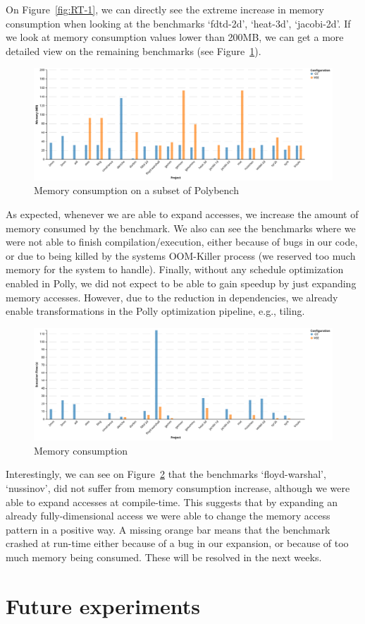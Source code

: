 On Figure~\ref{fig:RT-1}, we can directly see the extreme increase in memory consumption when looking at the benchmarks ‘fdtd-2d’, ‘heat-3d’, ‘jacobi-2d’. If we look at memory consumption values lower than 200MB, we can get a more detailed view on the remaining benchmarks (see Figure~\ref{fig:RT-2}).

\begin{figure}
\centering
\includegraphics[angle=90,origin=c,scale=0.5]{gfx/Evaluation/RT-2.png}
\caption{Memory consumption on a subset of Polybench}
\label{fig:RT-2}
\end{figure}

As expected, whenever we are able to expand accesses, we increase the amount of memory consumed by the benchmark. We also can see the benchmarks where we were not able to finish compilation/execution, either because of bugs in our code, or due to being killed by the systems OOM-Killer process (we reserved too much memory for the system to handle). Finally, without any schedule optimization enabled in Polly, we did not expect to be able to gain speedup by just expanding memory accesses. However, due to the reduction in dependencies, we already enable transformations in the Polly optimization pipeline, e.g., tiling.

\begin{figure}
\centering
\includegraphics[angle=90,origin=c,scale=0.5]{gfx/Evaluation/RT-3.png}
\caption{Memory consumption}
\label{fig:RT-3}
\end{figure}

Interestingly, we can see on Figure~\ref{fig:RT-3} that the benchmarks ‘floyd-warshal’, ‘nussinov’, did not suffer from memory consumption increase, although we were able to expand accesses at compile-time. This suggests that by expanding an already fully-dimensional access we were able to change the memory access pattern in a positive way. A missing orange bar means that the benchmark crashed at run-time either because of a bug in our expansion, or because of too much memory being consumed. These will be resolved in the next weeks.

\section{Future experiments}
